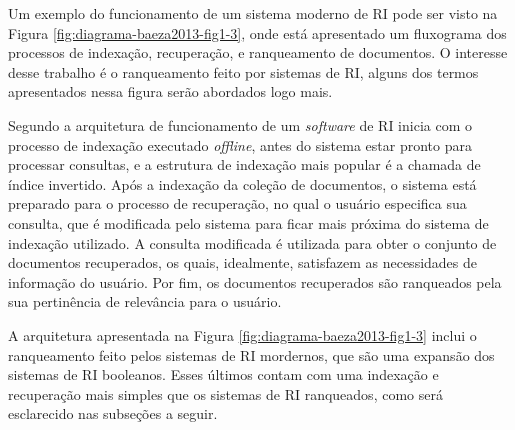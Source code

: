     Um exemplo do funcionamento de um sistema moderno de RI pode ser visto na Figura \ref{fig:diagrama-baeza2013-fig1-3}, onde está apresentado um fluxograma dos processos de indexação, recuperação, e ranqueamento de documentos.
    O interesse desse trabalho é o ranqueamento feito por sistemas de RI, alguns dos termos apresentados nessa figura serão abordados logo mais.

    
    
    Segundo  a arquitetura de funcionamento de um \textit{software} de RI inicia com o processo de indexação executado \textit{offline}, antes do sistema estar pronto para processar consultas, e a estrutura de indexação mais popular é a chamada de índice invertido.
    Após a indexação da coleção de documentos, o sistema está preparado para o processo de recuperação, no qual o usuário especifica sua consulta, que é modificada pelo sistema para ficar mais próxima do sistema de indexação utilizado.
    A consulta modificada é utilizada para obter o conjunto de documentos recuperados, os quais, idealmente, satisfazem as necessidades de informação do usuário.
    Por fim, os documentos recuperados são ranqueados pela sua pertinência de relevância para o usuário.
    
    A arquitetura apresentada na Figura \ref{fig:diagrama-baeza2013-fig1-3} inclui o ranqueamento feito pelos sistemas de RI mordernos, que são uma expansão dos sistemas de RI booleanos.
    Esses últimos contam com uma indexação e recuperação mais simples que os sistemas de RI ranqueados, como será esclarecido nas subseções a seguir.

    
    
    

